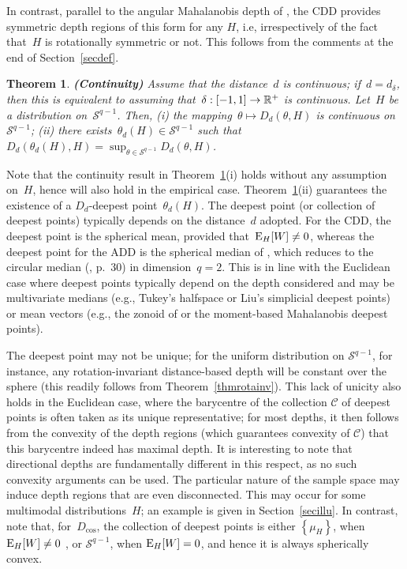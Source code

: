 \documentclass[usenames,dvipsnames]{article}
\newtheorem{thm}{Theorem}
\begin{document}
In contrast, parallel to the angular Mahalanobis depth of \cite{Leyetal2014}, the CDD provides symmetric depth regions of this form for any $H$, i.e, irrespectively of the fact that~$H$ is rotationally symmetric or not. This follows from the comments at the end of Section~\ref{secdef}.

\begin{thm}{\textbf{(Continuity)}} 
\label{thcontinuity}
Assume that the distance~$d$ is continuous; if~$d=d_\delta$, then this is equivalent to assuming that~$\delta:[-1,1]\to \mathbb{R}^+$ is continuous. Let~$H$ be a distribution on~$\mathcal{S}^{q-1}$. Then, (i) the mapping~$\theta\mapsto D_{d}(\theta, H)$ is continuous on~$\mathcal{S}^{q-1}$; (ii) there exists~$\theta_{d}(H)\in\mathcal{S}^{q-1}$ such that $D_{d}(\theta_d(H),H)=\sup_{\theta\in\mathcal{S}^{q-1}} D_{d}(\theta,H)$. 
\end{thm}

Note that the continuity result in Theorem~\ref{thcontinuity}(i) holds without any assumption on~$H$, hence will also hold in the empirical case. Theorem~\ref{thcontinuity}(ii) guarantees the existence of a $D_{d}$-deepest point~$\theta_{d}(H)$. The deepest point (or collection of deepest points) typically depends on the distance~$d$ adopted. For the CDD, the deepest point is the spherical mean, provided that~${\rm E}_H[W]\neq 0$, whereas the deepest point for the ADD is the spherical median of \cite{Fis1985}, which reduces to the circular median (\citealp{MarJup2000},  p.~30) in dimension~$q=2$. 
This is in line with the Euclidean case where deepest points typically depend on the depth considered and may be multivariate medians (e.g., Tukey's halfspace or Liu's simplicial deepest points) or mean vectors (e.g., the zonoid of \cite{KosMos1997} or the moment-based Mahalanobis deepest points). 

The deepest point may not be unique; for the uniform distribution on $\mathcal{S}^{q-1}$, for instance, any rotation-invariant distance-based depth will be constant over the sphere (this readily follows from Theorem~\ref{thmrotainv}). 
This lack of unicity also holds in the Euclidean case, where the barycentre of the collection $\mathcal{C}$ of deepest points is often taken as its unique representative; for most depths, it then follows from the convexity of the depth regions (which guarantees convexity of $\mathcal{C}$) that this barycentre indeed has maximal depth.  
It is interesting to note that directional depths 
are fundamentally different in this respect, as no such convexity arguments can be used. The particular nature of the sample space may induce depth regions that are even disconnected. This may occur for some multimodal distributions~$H$; an example is given in Section~\ref{secillu}. 
In contrast, note that, for~$D_{\cos}$, the collection of deepest points is either $\left\{\mu_{H}\right\}$, when ${\rm E}_H[W]\neq 0$ , or $\mathcal{S}^{q-1}$, when ${\rm E}_H[W]=0$, and hence it is always spherically convex.
\end{document}
